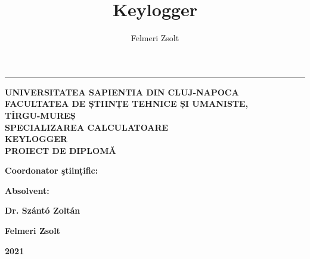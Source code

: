 \documentclass[a4paper, 11pt]{article}
\title{Keylogger}
\author{Felmeri Zsolt}
\date{}
\begin{document}
 
\begin{titlepage}
\rule[20pt]{\textwidth}{1pt}
\begin{centering}
\vspace{4pt}
{\fontsize{18pt}{1} \textbf{UNIVERSITATEA SAPIENTIA DIN CLUJ-NAPOCA}}\\ \vspace{4pt}
{\fontsize{16pt}{1} \textbf{FACULTATEA DE ȘTIINȚE TEHNICE ȘI UMANISTE,\\
TÎRGU-MUREȘ\\
SPECIALIZAREA CALCULATOARE}}\\
\vspace{10em}
{\fontsize{28pt}{1} \textbf{KEYLOGGER}} \\
\vspace{10em}
{\fontsize{24pt}{1} \textbf{PROIECT DE DIPLOMĂ}}\\
\end{centering}

\vspace{15em}
\begin{noindent}
{\fontsize{16pt}{1} \textbf{Coordonator ştiințific:}}
\begin{hfill}
{\fontsize{16pt}{1} \textbf{Absolvent:}}
\end{hfill}
\end{noindent}

\begin{noindent}
\hspace{2.5em}
{\fontsize{14pt}{1} \textbf{Dr. Szántó Zoltán}}
\begin{hfill}
{\fontsize{14pt}{1} \textbf{Felmeri Zsolt}}
\end{hfill}
\end{noindent}

\vspace{5em}
\centering
{\fontsize{28pt}{1} \textbf{2021}}
\end{titlepage}
\end{document}
